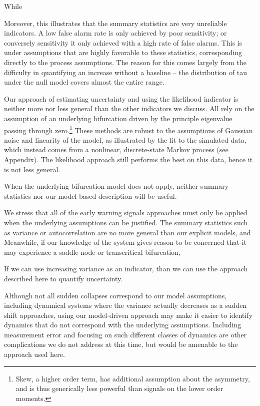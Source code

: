 \documentclass{pnastwo}
\begin{document}
\begin{article}
While 



Moreover, this illustrates that the summary statistics are very unreliable indicators. 
A low false alarm rate is only achieved by poor sensitivity; 
or conversely sensitivity it only achieved with a high rate of false alarms.  
This is under assumptions that are highly favorable to these statistics, corresponding directly to the process assumptions.  
The reason for this comes largely from the difficulty in quantifying an increase without a baseline -- 
the distribution of tau under the null model covers almost the entire range.  %

Our approach of estimating uncertainty and using the likelihood indicator is neither more nor less general than the other indicators we discuss.  
All rely on the assumption of an underlying bifurcation driven by the principle eigenvalue passing through zero.\footnote{
Skew, a higher order term, has additional assumption about the asymmetry,
and is thus generically less powerful than signals on the lower order moments.} 
These methods are robust to the assumptions of Gaussian noise and linearity of the model,
as illustrated by the fit to the simulated data, 
which instead comes from a nonlinear, discrete-state Markov process (see Appendix).  
The likelihood approach still performs the best on this data, hence it is not less general.  

When the underlying bifurcation model does not apply, neither summary statistics nor our model-based description will be useful.  

We stress that all of the early warning signals approaches must only be applied when the underlying assumptions can be justified.  
The summary statistics such as variance or autocorrelation are no more general than our explicit models, %
and 
Meanwhile, if our knowledge of the system gives reason to be concerned that it may experience a saddle-node or transcritical bifurcation,

If we can use increasing variance as an indicator, than we can use the approach described here to quantify uncertainty.  

Although not all sudden collapses correspond to our model assumptions,
including dynamical systems where the variance actually decreases as a sudden shift approaches,⁠
using our model-driven approach may make it easier to identify dynamics that do not correspond with the underlying assumptions.  
Including measurement error and focusing on such different classes of dynamics are other complications we do not address at this time, 
but would be amenable to the approach used here. 


\end{article}
\end{document}
